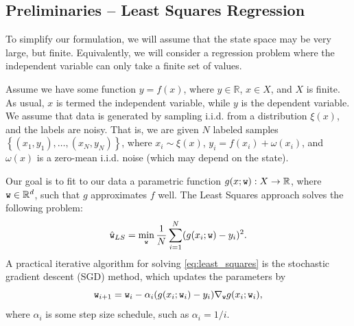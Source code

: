 

\subsection{Preliminaries -- Least Squares Regression}\label{ssec:least_squares_regression}
To simplify our formulation, we will assume that the state space may be very large, but finite. Equivalently, we will consider a regression problem where the independent variable can only take a finite set of values. 

Assume we have some function $y = f(x)$, where $y \in \mathbb{R}$, $x\in X$, and $X$ is finite. As usual, $x$ is termed the independent variable, while $y$ is the dependent variable. We assume that data is generated by sampling i.i.d. from a distribution $\xi(x)$, and the labels are noisy. That is, we are given $N$ labeled samples $\left\{(x_1, y_1),\dots, (x_N, y_N) \right\}$, where $x_i \sim \xi(x)$, $y_i = f(x_i) + \omega(x_i)$, and $\omega(x)$ is a zero-mean i.i.d. noise (which may depend on the state).

Our goal is to fit to our data a parametric function $g(x;{\tt w}):X \to \mathbb{R}$, where ${\tt w} \in \mathbb{R}^{d}$, such that $g$ approximates $f$ well. The Least Squares approach solves the following problem:
\begin{equation}\label{eq:least_squares}
\hat{{\tt w}}_{LS} = \min_{\tt w} \frac{1}{N}\sum_{i=1}^N (g(x_i;{\tt w}) - y_i)^2.
\end{equation}
A practical iterative algorithm for solving \eqref{eq:least_squares} is the stochastic gradient descent (SGD) method, which updates the parameters by
\begin{equation}\label{eq:sgd}
{\tt w}_{i+1} = {\tt w}_i - \alpha_i (g(x_i;{\tt w}_i) - y_i)\nabla_{\tt w} g(x_i;{\tt w}_i),
\end{equation}
where $\alpha_i$ is some step size schedule, such as $\alpha_i = 1/i$.



